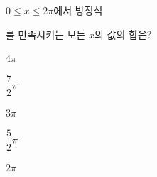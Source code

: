 $0\le x\le 2\pi$에서 방정식\par\smallskip{}\par{}\par\smallskip\noindent 를 만족시키는 모든 $x$의 값의 합은?
\begin{choices32}{\rule[-3ex]{0pt}{8ex}$4\pi$}{\rule[-3ex]{0pt}{8ex}$\dfrac{7}{2}\pi$}{\rule[-3ex]{0pt}{8ex}$3\pi$}{\rule[-3ex]{0pt}{8ex}$\dfrac{5}{2}\pi$}{\rule[-3ex]{0pt}{8ex}$2\pi$}\end{choices32}
